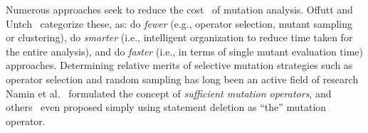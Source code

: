 Numerous approaches seek to reduce the cost~\cite{jia2011analysis} of mutation
analysis. Offutt and Untch~\cite{offutt2001mutation} categorize these,
as: do \textit{fewer} (e.g., operator selection, mutant sampling or clustering),
do \textit{smarter} (i.e., intelligent organization to reduce time taken for the
entire analysis), and do \textit{faster} (i.e., in terms of single mutant
evaluation time) approaches. 
Determining relative merits of selective mutation strategies such as operator
selection and random sampling has long been an active field of
research~\cite{wong1995reducing,mresa1999efficiency,zhang2010isoperator} 
Namin et al.~\cite{namin2006finding,namin2008sufficient} formulated the
concept of \emph{sufficient mutation operators}, and
others~\cite{untch2009onreduced, deng2013empirical} even proposed simply using statement
deletion as ``the'' mutation operator.  
